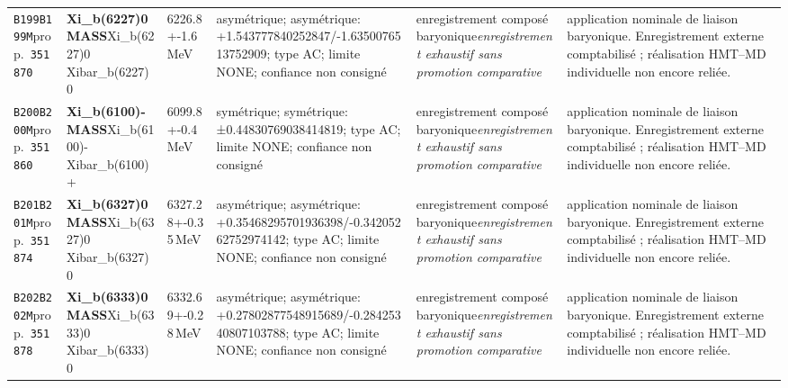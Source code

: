 \begin{landscape}
\begin{longtable}{L{1.85cm}L{4.45cm}L{2.35cm}L{4.05cm}L{3.35cm}L{7.15cm}}
\texttt{B199}\newline \texttt{B199M}\newline prop.\ \texttt{351870} & \textbf{Xi\_\allowbreak{}b(6227)0 MASS}\newline Xi\_\allowbreak{}b(6227)0 \textbar{}\allowbreak{} Xibar\_\allowbreak{}b(6227)0 & 6226.8+-1.6\,MeV & asymétrique; asymétrique: +1.543777840252847/-1.6350076513752909; type AC; limite NONE; confiance non consigné & enregistrement composé baryonique\newline \emph{enregistrement exhaustif sans promotion comparative} & application nominale de liaison baryonique. Enregistrement externe comptabilisé ; réalisation HMT--MD individuelle non encore reliée. \\
\texttt{B200}\newline \texttt{B200M}\newline prop.\ \texttt{351860} & \textbf{Xi\_\allowbreak{}b(6100)- MASS}\newline Xi\_\allowbreak{}b(6100)- \textbar{}\allowbreak{} Xibar\_\allowbreak{}b(6100)+ & 6099.8+-0.4\,MeV & symétrique; symétrique: ±0.44830769038414819; type AC; limite NONE; confiance non consigné & enregistrement composé baryonique\newline \emph{enregistrement exhaustif sans promotion comparative} & application nominale de liaison baryonique. Enregistrement externe comptabilisé ; réalisation HMT--MD individuelle non encore reliée. \\
\texttt{B201}\newline \texttt{B201M}\newline prop.\ \texttt{351874} & \textbf{Xi\_\allowbreak{}b(6327)0 MASS}\newline Xi\_\allowbreak{}b(6327)0 \textbar{}\allowbreak{} Xibar\_\allowbreak{}b(6327)0 & 6327.28+-0.35\,MeV & asymétrique; asymétrique: +0.35468295701936398/-0.34205262752974142; type AC; limite NONE; confiance non consigné & enregistrement composé baryonique\newline \emph{enregistrement exhaustif sans promotion comparative} & application nominale de liaison baryonique. Enregistrement externe comptabilisé ; réalisation HMT--MD individuelle non encore reliée. \\
\texttt{B202}\newline \texttt{B202M}\newline prop.\ \texttt{351878} & \textbf{Xi\_\allowbreak{}b(6333)0 MASS}\newline Xi\_\allowbreak{}b(6333)0 \textbar{}\allowbreak{} Xibar\_\allowbreak{}b(6333)0 & 6332.69+-0.28\,MeV & asymétrique; asymétrique: +0.27802877548915689/-0.28425340807103788; type AC; limite NONE; confiance non consigné & enregistrement composé baryonique\newline \emph{enregistrement exhaustif sans promotion comparative} & application nominale de liaison baryonique. Enregistrement externe comptabilisé ; réalisation HMT--MD individuelle non encore reliée. \\

\end{longtable}
\end{landscape}
